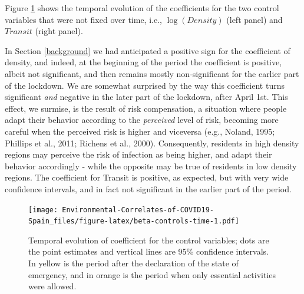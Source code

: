 \documentclass[]{elsarticle} %
\begin{document}
Figure \ref{fig:beta-controls-time} shows the temporal evolution of the
coefficients for the two control variables that were not fixed over
time, i.e., \(\log(Density)\) (left panel) and \(Transit\) (right
panel).

In Section \ref{background} we had anticipated a positive sign for the
coefficient of density, and indeed, at the beginning of the period the
coefficient is positive, albeit not significant, and then remains mostly
non-significant for the earlier part of the lockdown. We are somewhat
surprised by the way this coefficient turns significant \emph{and}
negative in the later part of the lockdown, after April 1st. This
effect, we surmise, is the result of risk compensation, a situation
where people adapt their behavior according to the \emph{perceived}
level of risk, becoming more careful when the perceived risk is higher
and viceversa (e.g., Noland, 1995; Phillips et al., 2011; Richens et
al., 2000). Consequently, residents in high density regions may perceive
the risk of infection as being higher, and adapt their behavior
accordingly - while the opposite may be true of residents in low density
regions. The coefficient for Transit is positive, as expected, but with
very wide confidence intervals, and in fact not significant in the
earlier part of the period.

\begin{figure}
\centering
\texttt{[image: Environmental-Correlates-of-COVID19-Spain\_files/figure-latex/beta-controls-time-1.pdf]}
\caption{\label{fig:beta-controls-time}Temporal evolution of coefficient
for the control variables; dots are the point estimates and vertical
lines are 95\% confidence intervals. In yellow is the period after the
declaration of the state of emergency, and in orange is the period when
only essential activities were allowed.}
\end{figure}
\end{document}
